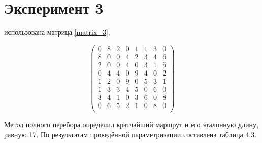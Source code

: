 \section{Эксперимент 3}
 использована матрица \ref{matrix_3}.

\begin{scriptsize} 
	\begin{equation}\label{matrix_3}
		\left(
		\begin{array}{cccccccc}
			0& 8& 2& 0& 1& 1& 3& 0\\
			8&  0& 0& 4& 2& 3& 4& 6\\
			2& 0&  0& 4& 0& 3& 1& 5\\
			0& 4& 4&  0& 9& 4& 0& 2\\
			1& 2& 0& 9&  0& 5& 3& 1\\
			1& 3& 3& 4& 5&  0& 6& 0\\
			3& 4& 1& 0& 3& 6&  0& 8\\
			0& 6& 5& 2& 1& 0& 8&  0\\
		\end{array}\right)
\end{equation} \end{scriptsize}

Метод полного перебора определил кратчайший маршрут и его эталонную длину, равную 17. По результатам проведённой параметризации составлена \hyperref[table_3]{таблица 4.3}.



